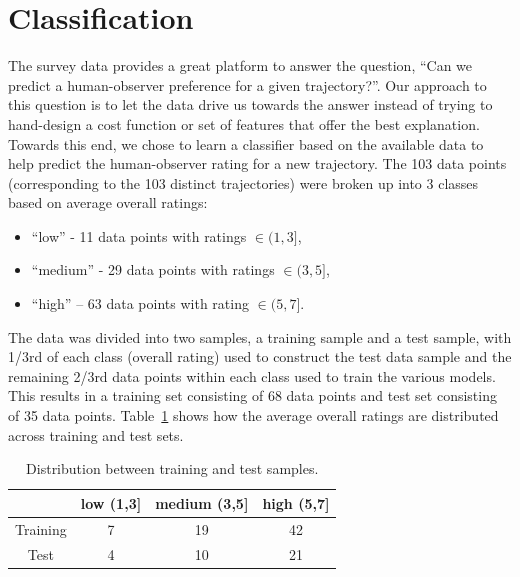 \documentclass[letterpaper, 10 pt, conference]{ieeeconf}  %
\begin{document}
\section{Classification}
The survey data provides a great platform to answer the question, ``Can we predict a human-observer preference for a given trajectory?''. Our approach to this question is to let the data drive us towards the answer instead of trying to hand-design a cost function or set of features that offer the best explanation. Towards this end, we chose to learn a classifier based on the available data to help predict the human-observer rating for a new trajectory. The 103 data points (corresponding to the 103 distinct trajectories) were broken up into 3 classes based on average overall ratings:
\begin{itemize}
\item “low” - 11 data points with ratings $\in (1,3]$,
\item “medium”  - 29 data points with ratings $\in (3,5]$,
\item “high” – 63 data points with rating $\in (5,7]$.
\end{itemize}
The data was divided into two samples, a training sample and a test sample, with 1/3rd of each class (overall rating) used to construct the test data sample and the remaining 2/3rd data points within each class used to train the various models. This results in a training set consisting of 68 data points and test set consisting of 35 data points. Table~\ref{tab:test_training} shows how the average overall ratings are distributed across training and test sets.
\begin{table}[h]
\begin{centering}
\begin{tabular}{|c|c|c|c|}
\hline
 & low (1,3] & medium (3,5] & high (5,7] \\ \hline
Training & 7 & 19 & 42 \\ \hline
Test & 4 & 10 & 21 \\ \hline
\end{tabular}
\caption{Distribution between training and test samples.}
\label{tab:test_training}
\end{centering}
\end{table}
\end{document}
